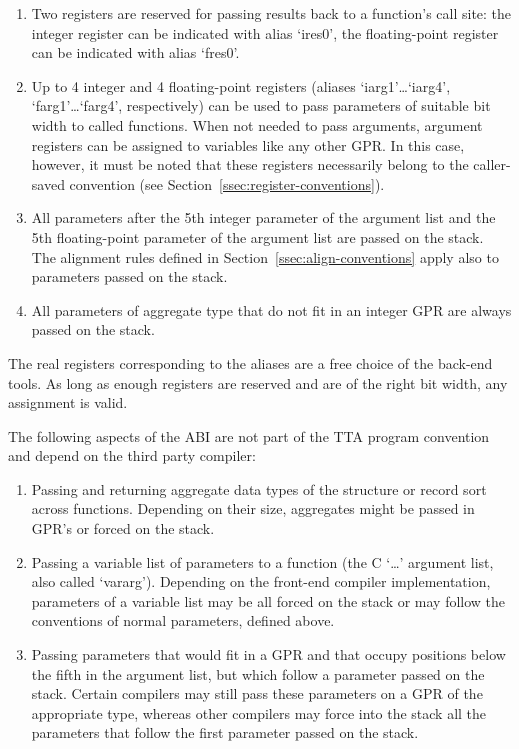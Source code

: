 \documentclass[twoside]{tce}
\begin{document}
\begin{enumerate}
\item %
  Two registers are reserved for passing results back to a function's call
  site: the integer register can be indicated with alias `ires0', the
  floating-point register can be indicated with alias `fres0'.
\item %
  Up to 4 integer and 4 floating-point registers (aliases
  `iarg1'\ldots`iarg4', `farg1'\ldots`farg4', respectively) can be used to
  pass parameters of suitable bit width to called functions.  When not
  needed to pass arguments, argument registers can be assigned to variables
  like any other GPR.  In this case, however, it must be noted that these
  registers necessarily belong to the caller-saved convention (see
  Section~\ref{ssec:register-conventions}).
\item %
  All parameters after the 5th integer parameter of the argument list and
  the 5th floating-point parameter of the argument list are passed on the
  stack.  The alignment rules defined in
  Section~\ref{ssec:align-conventions} apply also to parameters passed on
  the stack.
\item %
  All parameters of aggregate type that do not fit in an integer GPR are
  always passed on the stack.
\end{enumerate}

The real registers corresponding to the aliases are a free choice of the
back-end tools.  As long as enough registers are reserved and are of the
right bit width, any assignment is valid.

The following aspects of the ABI are not part of the TTA program convention
and depend on the third party compiler:
\begin{enumerate}
\item %
  Passing and returning aggregate data types of the structure or record sort
  across functions.  Depending on their size, aggregates might be passed in
  GPR's or forced on the stack.
\item %
  Passing a variable list of parameters to a function (the C `\ldots'
  argument list, also called `vararg').  Depending on the front-end compiler
  implementation, parameters of a variable list may be all forced on the
  stack or may follow the conventions of normal parameters, defined above.
\item %
  Passing parameters that would fit in a GPR and that occupy positions below
  the fifth in the argument list, but which follow a parameter passed on the
  stack.  Certain compilers may still pass these parameters on a GPR of the
  appropriate type, whereas other compilers may force into the stack all the
  parameters that follow the first parameter passed on the stack.
\end{enumerate}
\end{document}

